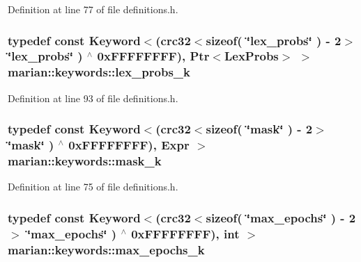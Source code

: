Definition at line 77 of file definitions.\+h.

\subsubsection[{\texorpdfstring{lex\+\_\+probs\+\_\+k}{lex_probs_k}}]{\setlength{\rightskip}{0pt plus 5cm}typedef const {\bf Keyword}$<$({\bf crc32}$<$sizeof( \char`\"{}lex\+\_\+probs\char`\"{} ) -\/ 2$>$ \char`\"{}{\bf lex\+\_\+probs}\char`\"{} ) $^\wedge$ 0x\+F\+F\+F\+F\+F\+F\+F\+F), Ptr$<$\+Lex\+Probs$>$ $>$ marian\+::keywords\+::lex\+\_\+probs\+\_\+k}\hypertarget{namespacemarian_1_1keywords_a54f72752fae434951210362068ef4317}{}\label{namespacemarian_1_1keywords_a54f72752fae434951210362068ef4317}


Definition at line 93 of file definitions.\+h.

\subsubsection[{\texorpdfstring{mask\+\_\+k}{mask_k}}]{\setlength{\rightskip}{0pt plus 5cm}typedef const {\bf Keyword}$<$({\bf crc32}$<$sizeof( \char`\"{}mask\char`\"{} ) -\/ 2$>$ \char`\"{}{\bf mask}\char`\"{} ) $^\wedge$ 0x\+F\+F\+F\+F\+F\+F\+F\+F), Expr $>$ marian\+::keywords\+::mask\+\_\+k}\hypertarget{namespacemarian_1_1keywords_a4fed5db0f88a6137048eda92fb776eb3}{}\label{namespacemarian_1_1keywords_a4fed5db0f88a6137048eda92fb776eb3}


Definition at line 75 of file definitions.\+h.

\subsubsection[{\texorpdfstring{max\+\_\+epochs\+\_\+k}{max_epochs_k}}]{\setlength{\rightskip}{0pt plus 5cm}typedef const {\bf Keyword}$<$({\bf crc32}$<$sizeof( \char`\"{}max\+\_\+epochs\char`\"{} ) -\/ 2$>$ \char`\"{}{\bf max\+\_\+epochs}\char`\"{} ) $^\wedge$ 0x\+F\+F\+F\+F\+F\+F\+F\+F), int $>$ marian\+::keywords\+::max\+\_\+epochs\+\_\+k}\hypertarget{namespacemarian_1_1keywords_a6ed8bd5dbf10318dcdac1c1920b342a9}{}\label{namespacemarian_1_1keywords_a6ed8bd5dbf10318dcdac1c1920b342a9}


